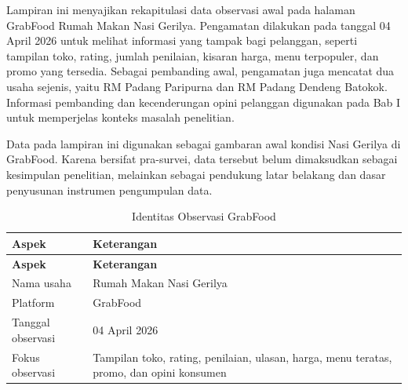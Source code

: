\label{app:observasi-grabfood}

Lampiran ini menyajikan rekapitulasi data observasi awal pada halaman GrabFood Rumah Makan Nasi Gerilya. Pengamatan dilakukan pada tanggal 04 April 2026 untuk melihat informasi yang tampak bagi pelanggan, seperti tampilan toko, rating, jumlah penilaian, kisaran harga, menu terpopuler, dan promo yang tersedia. Sebagai pembanding awal, pengamatan juga mencatat dua usaha sejenis, yaitu RM Padang Paripurna dan RM Padang Dendeng Batokok. Informasi pembanding dan kecenderungan opini pelanggan digunakan pada Bab I untuk memperjelas konteks masalah penelitian.

Data pada lampiran ini digunakan sebagai gambaran awal kondisi Nasi Gerilya di GrabFood. Karena bersifat pra-survei, data tersebut belum dimaksudkan sebagai kesimpulan penelitian, melainkan sebagai pendukung latar belakang dan dasar penyusunan instrumen pengumpulan data.

\begingroup
\begin{xltabular}{\textwidth}{|Z{3.4cm}|Y|}
\caption{Identitas Observasi GrabFood}
\label{tab:identitas_observasi_grabfood} \\
        \toprule
        \textbf{Aspek}    & \textbf{Keterangan}                                                           \\ \hline
        \midrule
\endfirsthead
{}
        \toprule
        \textbf{Aspek}    & \textbf{Keterangan}                                                           \\ \hline
        \midrule
\endhead
{}
\endfoot
        \bottomrule
        \endlastfoot
        Nama usaha        & Rumah Makan Nasi Gerilya                                                      \\ \hline
        Platform          & GrabFood                                                                      \\ \hline
        Tanggal observasi & 04 April 2026                                                                 \\ \hline
        Fokus observasi   & Tampilan toko, rating, penilaian, ulasan, harga, menu teratas, promo, dan opini konsumen \\ \hline
        \bottomrule
    
\end{xltabular}
\endgroup

